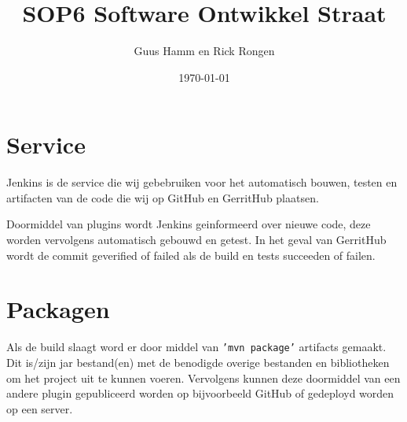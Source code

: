 \documentclass{scrreprt}
\title{SOP6 Software Ontwikkel Straat}
\author{Guus Hamm en Rick Rongen}
\date{\today}
\begin{document}
	\maketitle
	\tableofcontents
	\newpage
	\chapter{Service}
		\par Jenkins is de service die wij gebebruiken voor het automatisch bouwen, testen en artifacten van de code die wij op GitHub en GerritHub plaatsen. 
		\par Doormiddel van plugins wordt Jenkins geinformeerd over nieuwe code, deze worden vervolgens automatisch gebouwd en getest. In het geval van GerritHub wordt de commit geverified of failed als de build en tests succeeden of failen.
	\chapter{Packagen}
		\par Als de build slaagt word er door middel van \texttt{'mvn package'} artifacts gemaakt. Dit is/zijn jar bestand(en) met de benodigde overige bestanden en bibliotheken om het project uit te kunnen voeren. Vervolgens kunnen deze doormiddel van een andere plugin gepubliceerd worden op bijvoorbeeld GitHub of gedeployd worden op een server.
\end{document}
